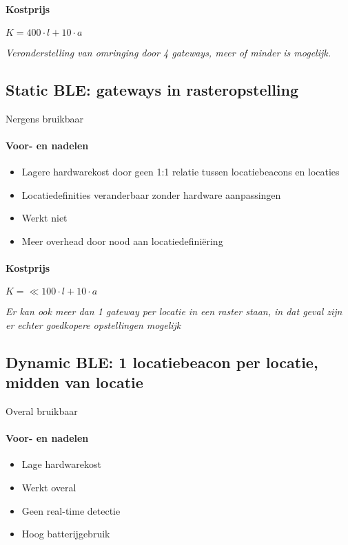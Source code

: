 \paragraph{Kostprijs}
\(K = 400 \cdot l + 10 \cdot a\)

\emph{Veronderstelling van omringing door 4 gateways, meer of minder is mogelijk.}

\subsection{Static BLE: gateways in rasteropstelling}
Nergens bruikbaar
\paragraph{Voor- en nadelen}
\begin{itemize}
	\color{ForestGreen}
	\item Lagere hardwarekost door geen 1:1 relatie tussen locatiebeacons en locaties
	\item Locatiedefinities veranderbaar zonder hardware aanpassingen
	\color{RedOrange}
	\item Werkt niet
	\item Meer overhead door nood aan locatiedefiniëring
\end{itemize}
\paragraph{Kostprijs}
\(K = \ll100 \cdot l + 10 \cdot a\)

\emph{Er kan ook meer dan 1 gateway per locatie in een raster staan, in dat geval zijn er echter goedkopere opstellingen mogelijk}

\subsection{Dynamic BLE: 1 locatiebeacon per locatie, midden van locatie}
Overal bruikbaar
\paragraph{Voor- en nadelen}
\begin{itemize}
	\color{ForestGreen}
	\item Lage hardwarekost
	\item Werkt overal
	\color{RedOrange}
	\item Geen real-time detectie
	\item Hoog batterijgebruik
\end{itemize}
